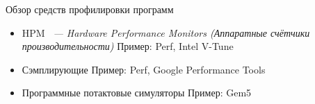 \documentclass[10pt,aspectratio=169,hyperref={pdftex,unicode},xcolor=dvipsnames]{beamer}
\begin{document}
\begin{frame}{ Обзор средств профилировки программ }
    \begin{itemize}
        \item
            HPM\textit{
                \footnotesize
                ~--- Hardware Performance Monitors (Аппаратные счётчики производительности)
            }
            \newline
                Пример: Perf, Intel V-Tune
        \item
            Сэмплирующие \newline
            Пример: Perf, Google Performance Tools
        \item
            Программные потактовые симуляторы \newline
            Пример: Gem5
    \end{itemize}



\end{frame}
\end{document}
